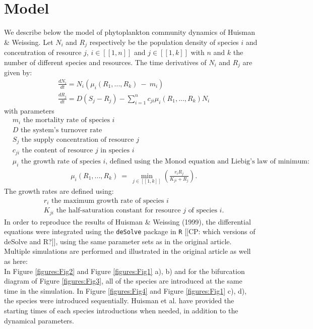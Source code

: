 \section{Model}
We describe below the model of phytoplankton community dynamics of Huisman \& Weissing\supercite{1999:Huisman}.
Let $N_i$ and $R_j$ respectively be the population density of species $i$ and concentration of resource 
$j$, $i\in[\![1,n]\!]$ and $j\in[\![1,k]\!]$ with $n$ and $k$ the number of 
different species and resources. The time derivatives of $N_i$ and $R_j$ are 
given by: \\
\begin{align}
	& \frac{dN_i}{dt}= N_i(\mu_i(R_1,...,R_k)~-~m_i)\\
	& \frac{dR_j}{dt}= D(S_j-R_j) - \sum_{i=1}^n c_{ji} 
\mu_i(R_1,...,R_k)N_i
\end{align}
with parameters
\begin{align*}
& m_i \text{ the mortality rate of species $i$}\\
& D \text{ the system's turnover rate}\\
& S_j \text{ the supply concentration of resource $j$}\\
& c_{ji} \text{ the content of resource $j$ in species $i$}\\
& \mu_i \text{ the growth rate of species $i$, defined using the Monod equation and Liebig's law of minimum: }
\end{align*}
\begin{align}
&\mu_i(R_1,...,R_k)~=~\min_{j\in[\![1,k]\!]}(\frac{r_iR_j}{K_{ji}+R_j}). 
\end{align}
The growth rates are defined using: 
\begin{align*}
&r_i \text{ the maximum growth rate of species $i$}\\
&K_{	ji} \text{ the half-saturation constant for resource $j$ of species $i$.}
\end{align*}
In order to reproduce the results of Huisman \& Weissing (1999), the differential 
equations were integrated using the \texttt{deSolve} package in \texttt{R} {\color{blue}[[CP: which versions of deSolve and R?]]}, using the same parameter 
sets as in the original article.\\

Multiple simulations are performed and illustrated in the original article as well as here: \\
In Figure \ref{figures:Fig2} and Figure \ref{figures:Fig1} a), b) and for the 
bifurcation diagram of Figure \ref{figures:Fig3}, all of the species are 
introduced at the same time in the simulation. In Figure \ref{figures:Fig4} and 
Figure \ref{figures:Fig1} c), d), the species were introduced sequentially. 
Huisman et al.\supercite{1999:Huisman} have provided the starting times 
of each species introductions when needed, in addition to the dynamical parameters.\\


